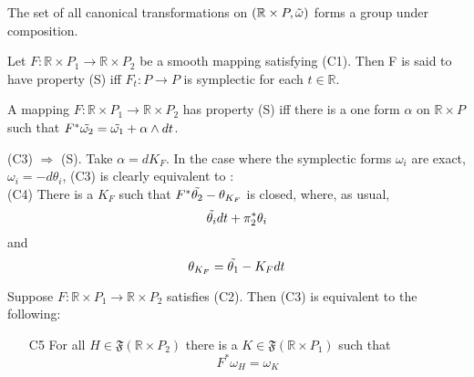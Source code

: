 \begin{prop}

The set of all canonical transformations on $(\mathbb{R} \times P, \Tilde{\omega})$ forms a group under composition.

\end{prop}

\begin{defn}
    Let $F: \mathbb{R} \times P_1 \to \mathbb{R} \times P_2$ be a smooth mapping satisfying (C1). Then F is said to have property (S) iff $F_t: P \to P$ is symplectic for each $t \in \mathbb{R}$.

\end{defn}

\begin{prop}
    A mapping $F: \mathbb{R} \times P_1 \to \mathbb{R}\times P_2$ has property (S) iff there is a one form $\alpha$ on $\mathbb{R} \times P$ such that $F^*\Tilde{\omega_2} = \Tilde{\omega_1} + \alpha \wedge dt$.

\end{prop}

\begin{prop}
    (C3) $\Rightarrow$ (S). Take $\alpha = dK_F$. In the case where the symplectic forms $\omega_i$ are exact, $\omega_i=-d\theta_i$, (C3) is clearly equivalent to :\\

    (C4) There is a $K_F$ such that $F^*\Tilde{\theta_2} - \theta_{K_F}$ is closed, where, as usual,
    \[ \Tilde{\theta_i} dt + \pi_2^* \theta_i \]
    and
    \[ \theta_{K_F} = \Tilde{\theta_1} - K_F dt \]
\end{prop}

\begin{prop}
    Suppose $F: \mathbb{R} \times P_1 \to \mathbb{R} \times P_2$ satisfies (C2). Then (C3) is equivalent to the following:\\
    

    \begin{enumerate}
    \item[C5] For all $H \in \mathfrak{F}(\mathbb{R} \times P_2)$ there is a $K \in \mathfrak{F}(\mathbb{R} \times P_1)$ such that
    \[ F^*\omega_H = \omega_K \]
    \end{enumerate}

\end{prop}

